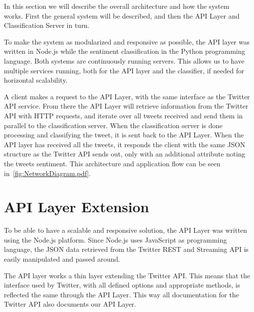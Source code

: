 In this section we will describe the overall architecture and how the system works. First the general system will be described, and then the API Layer and Classification Server in turn.  

To make the system as modularized and responsive as possible, the API layer was written in Node.js while the sentiment classification in the Python programming language. Both systems are continuously running servers. This allows us to have multiple services running, both for the API layer and the classifier, if needed for horizontal scalability. 


A client makes a request to the API Layer, with the same interface as the Twitter API service. From there the API Layer will retrieve information from the Twitter API with HTTP requests, and iterate over all tweets received and send them in parallel to the classification server. When the classification server is done processing and classifying the tweet, it is sent back to the API Layer. When the API layer has received all the tweets, it responds the client with the same JSON structure as the Twitter API sends out, only with an additional attribute noting the tweets sentiment. This architecture and application flow can be seen in~\autoref{fig:NetworkDiagram.pdf}. 

\section{API Layer Extension}




To be able to have a scalable and responsive solution, the API Layer was written using the Node.js platform. Since Node.js uses JavaScript as programming language, the JSON data retrieved from the Twitter REST and Streaming API is easily manipulated and passed around. 

The API layer works a thin layer extending the Twitter API. This means that the interface used by Twitter, with all defined options and appropriate methods, is reflected the same through the API Layer. This way all documentation for the Twitter API also documents our API Layer. 



